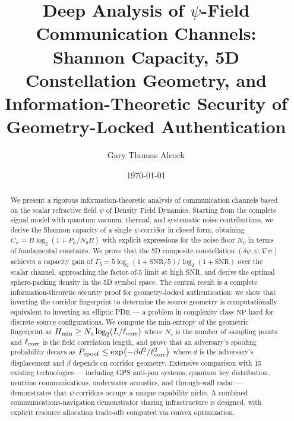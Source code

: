 \documentclass[twocolumn,superscriptaddress,prd,nofootinbib]{revtex4-2}
\newcommand{\SNR}{\mathrm{SNR}}
\newcommand{\Hmin}{H_{\min}}
\begin{document}
\title{Deep Analysis of $\psi$-Field Communication Channels:\\
Shannon Capacity, 5D Constellation Geometry, and\\
Information-Theoretic Security of Geometry-Locked Authentication}

\author{Gary Thomas Alcock}

\date{\today}

\begin{abstract}
We present a rigorous information-theoretic analysis of communication
channels based on the scalar refractive field $\psi$ of Density Field
Dynamics. Starting from the complete signal model with quantum vacuum,
thermal, and systematic noise contributions, we derive the Shannon
capacity of a single $\psi$-corridor in closed form, obtaining
$C_\psi = B\log_2(1 + P_\psi/N_0 B)$ with explicit expressions for the
noise floor $N_0$ in terms of fundamental constants. We prove that the
5D composite constellation $(\delta\psi, \dot\psi, \nabla\psi)$ achieves
a capacity gain of $\Gamma_5 = 5\log_2(1 + \SNR/5)/\log_2(1+\SNR)$
over the scalar channel, approaching the factor-of-5 limit at high SNR,
and derive the optimal sphere-packing density in the 5D symbol space.
The central result is a complete information-theoretic security proof for
geometry-locked authentication: we show that inverting the corridor
fingerprint to determine the source geometry is computationally equivalent
to inverting an elliptic PDE --- a problem in complexity class
$\mathrm{NP}$-hard for discrete source configurations. We compute the
min-entropy of the geometric fingerprint as
$\Hmin \geq N_s \log_2(L/\ell_{\rm corr})$ where $N_s$ is the number of
sampling points and $\ell_{\rm corr}$ is the field correlation length,
and prove that an adversary's spoofing probability decays as
$P_{\rm spoof} \leq \exp(-\beta d^2/\ell_{\rm corr}^2)$ where $d$ is
the adversary's displacement and $\beta$ depends on corridor geometry.
Extensive comparison with 15 existing technologies --- including
GPS anti-jam systems, quantum key distribution, neutrino communications,
underwater acoustics, and through-wall radar --- demonstrates that
$\psi$-corridors occupy a unique capability niche. A combined
communications-navigation demonstrator sharing infrastructure is designed,
with explicit resource allocation trade-offs computed via convex
optimization.
\end{abstract}

\maketitle
\tableofcontents
\end{document}
